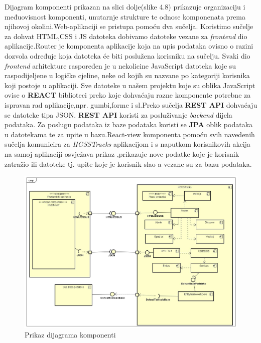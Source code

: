 		{Dijagram komponenti prikazan na slici dolje(slike 4.8) prikazuje organizaciju i međuovisnost komponenti, unutarnje strukture te odnose komponenata prema njihovoj okolini.Web-aplikaciji se pristupa pomoću dva sučelja. Koristimo sučelje za dohvat HTML,CSS i JS datoteka dobivamo datoteke vezane za \textit{frontend} dio aplikacije.Router je komponenta aplikacije koja na upis podataka ovisno o razini dozvola određuje koja datoteka će biti poslužena korisniku na sučelju. Svaki dio \textit{frontend} arhitekture raspoređen je u nekolicine JavaScript datoteka koje su raspodijeljene u logičke cjeline, neke od kojih su nazvane po kategoriji korisnika koji postoje u aplikaciji. Sve datoteke u našem projektu koje su oblika JavaScript ovise o \textbf{REACT} biblioteci preko koje dohvaćaju razne komponente potrebne za ispravan rad aplikacije,npr. gumbi,forme i sl.Preko sučelja \textbf{REST API} dohvaćaju se datoteke tipa JSON. \textbf{REST API} koristi za posluživanje \textit{backend} dijela podataka. Za poslugu podataka iz baze podataka koristi se \textbf{JPA} oblik podataka u datotekama te za upite u bazu.React-view komponenta pomoću svih navedenih sučelja komunicira za \textit{HGSSTracks} aplikacijom i s naputkom korisnikovih akcija na samoj aplikaciji osvježava prikaz ,prikazuje nove podatke koje je korisnik zatražio ili datoteke tj. upite koje je korisnik slao a vezane su za bazu podataka.}\\
		
		\begin{figure}[h!]
			\centering
			\includegraphics[width=\linewidth]{./slike/DijagramKomponenti.jpg}
			\caption{Prikaz dijagrama komponenti}
			
		\end{figure}